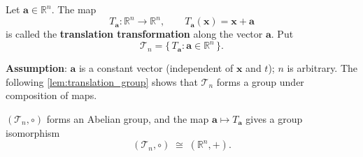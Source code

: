 \begin{definition}\label{def:translation_map}
Let $\mathbf{a} \in \mathbb{R}^n$. The map
\[
T_{\mathbf{a}}: \mathbb{R}^n \to \mathbb{R}^n, \qquad T_{\mathbf{a}}(\mathbf{x}) = \mathbf{x} + \mathbf{a}
\]
is called the \textbf{translation transformation} along the vector $\mathbf{a}$. Put
\[
\mathcal{T}_n = \{\, T_{\mathbf{a}} : \mathbf{a} \in \mathbb{R}^n \,\}.
\]

\textbf{Assumption}: $\mathbf a$ is a constant vector (independent of $\mathbf x$ and $t$); $n$ is arbitrary. The following \cref{lem:translation_group} shows that $\mathcal T_n$ forms a group under composition of maps.
\end{definition}

\begin{lemma}\label{lem:translation_group}
$(\mathcal{T}_n, \circ)$ forms an Abelian group, and the map $\mathbf{a} \mapsto T_{\mathbf{a}}$ gives a group isomorphism
\[
(\mathcal{T}_n, \circ) \;\cong\; (\mathbb{R}^n, +).
\]
\end{lemma}

